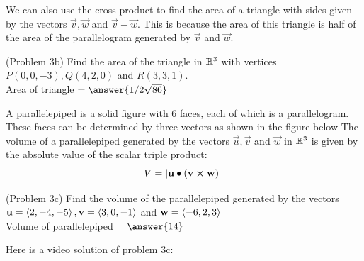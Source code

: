 \documentclass[handout]{ximera}
\begin{document}
We can also use the cross product to find the area of a triangle with sides given by the vectors $\vec{v}, \vec{w}$ and $\vec{v}-\vec{w}$. 
This is because the area of this triangle is half of the area of the parallelogram generated by $\vec{v}$ and $\vec{w}$.

\begin{image}
\end{image}

\begin{problem}(Problem 3b)
Find the area of the triangle in $\mathbb R^3$ with vertices $P(0,0,-3), Q(4,2,0)$ and $R(3,3,1)$.\\
Area of triangle  $=\answer{1/2 \sqrt{86}}$
\end{problem}



A parallelepiped is a solid figure with 6 faces, each of which is a parallelogram.
These faces can be determined by three vectors as shown in the figure below
The volume of a parallelepiped generated by the vectors $\vec{u}, \vec{v}$ and $\vec{w}$
in $\mathbb R^3$ is given by the absolute value of the scalar triple product:
\[
V = |\mathbf{u} \bullet \left(\mathbf{v} \boldsymbol\times \mathbf{w}\right)|
\]





\begin{image}
\end{image}

\begin{problem}(Problem 3c)
Find the volume of the parallelepiped generated by the vectors $\mathbf u = \left\langle 2,-4,-5\right\rangle, \mathbf v = \left\langle 3,0,-1\right\rangle$ and $\mathbf w = \left\langle -6,2,3\right\rangle$\\
Volume of parallelepiped $= \answer{14}$
\end{problem}

Here is a video solution of problem 3c:\\
\begin{foldable}
\end{foldable}
\end{document}
